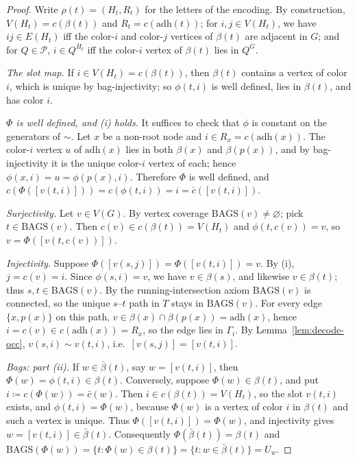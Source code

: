 \documentclass[11pt]{article}
\theoremstyle{definition}
\newcommand{\defeq}{\coloneqq}
\newcommand{\Bags}{\mathrm{BAGS}}
\newcommand{\adh}{\mathrm{adh}}
\newcommand{\Pred}{\mathcal P}
\begin{document}
\begin{proof}
Write \(\rho(t)=(H_t,R_t)\) for the letters of the encoding.  By construction,
\(V(H_t)=c(\beta(t))\) and \(R_t=c(\adh(t))\); for \(i,j\in V(H_t)\), we have
\(ij\in E(H_t)\) iff the color-\(i\) and color-\(j\) vertices of \(\beta(t)\)
are adjacent in \(G\); and for \(Q\in\Pred\), \(i\in Q^{H_t}\) iff the
color-\(i\) vertex of \(\beta(t)\) lies in \(Q^G\).

\emph{The slot map.}  If \(i\in V(H_t)=c(\beta(t))\), then \(\beta(t)\)
contains a vertex of color \(i\), which is unique by bag-injectivity; so
\(\phi(t,i)\) is well defined, lies in \(\beta(t)\), and has color \(i\).

\emph{\(\Phi\) is well defined, and (i) holds.}  It suffices to check that
\(\phi\) is constant on the generators of \(\sim\).  Let \(x\) be a non-root
node and \(i\in R_x=c(\adh(x))\).  The color-\(i\) vertex \(u\) of \(\adh(x)\)
lies in both \(\beta(x)\) and \(\beta(p(x))\), and by bag-injectivity it is
the unique color-\(i\) vertex of each; hence \(\phi(x,i)=u=\phi(p(x),i)\).
Therefore \(\Phi\) is well defined, and
\(c(\Phi([v(t,i)]))=c(\phi(t,i))=i=\bar c([v(t,i)])\).

\emph{Surjectivity.}  Let \(v\in V(G)\).  By vertex coverage
\(\Bags(v)\ne\varnothing\); pick \(t\in\Bags(v)\).  Then
\(c(v)\in c(\beta(t))=V(H_t)\) and \(\phi(t,c(v))=v\), so
\(v=\Phi([v(t,c(v))])\).

\emph{Injectivity.}  Suppose \(\Phi([v(s,j)])=\Phi([v(t,i)])=v\).  By (i),
\(j=c(v)=i\).  Since \(\phi(s,i)=v\), we have \(v\in\beta(s)\), and likewise
\(v\in\beta(t)\); thus \(s,t\in\Bags(v)\).  By the running-intersection axiom
\(\Bags(v)\) is connected, so the unique \(s\)--\(t\) path in \(T\) stays in
\(\Bags(v)\).  For every edge \(\{x,p(x)\}\) on this path,
\(v\in\beta(x)\cap\beta(p(x))=\adh(x)\), hence
\(i=c(v)\in c(\adh(x))=R_x\), so the edge lies in \(\Gamma_i\).  By
Lemma~\ref{lem:decode-occ}, \(v(s,i)\sim v(t,i)\), i.e.\
\([v(s,j)]=[v(t,i)]\).

\emph{Bags: part (ii).}  If \(w\in\bar\beta(t)\), say \(w=[v(t,i)]\), then
\(\Phi(w)=\phi(t,i)\in\beta(t)\).  Conversely, suppose \(\Phi(w)\in\beta(t)\),
and put \(i\defeq c(\Phi(w))=\bar c(w)\).  Then
\(i\in c(\beta(t))=V(H_t)\), so the slot \(v(t,i)\) exists, and
\(\phi(t,i)=\Phi(w)\), because \(\Phi(w)\) is a vertex of color \(i\) in
\(\beta(t)\) and such a vertex is unique.  Thus \(\Phi([v(t,i)])=\Phi(w)\),
and injectivity gives \(w=[v(t,i)]\in\bar\beta(t)\).  Consequently
\(\Phi(\bar\beta(t))=\beta(t)\) and
\(\Bags(\Phi(w))=\{t:\Phi(w)\in\beta(t)\}=\{t:w\in\bar\beta(t)\}=U_w\).


\end{proof}
\end{document}

